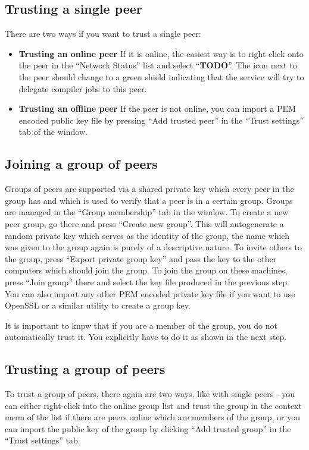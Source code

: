 \documentclass[a4paper,9pt]{scrartcl}
\begin{document}
\subsection{Trusting a single peer}
There are two ways if you want to trust a single peer:\\
\smallskip
\begin{itemize}
  \item{\bf Trusting an online peer} If it is online, the easiest way is to right click onto the peer in the ``Network Status'' list and select ``\textbf{TODO}''. The icon next to the peer should change to a green shield indicating that the service will try to delegate compiler jobs to this peer.
  \item{\bf Trusting an offline peer} If the peer is not online, you can import a PEM encoded public key file by pressing ``Add trusted peer'' in the ``Trust settings'' tab of the window.
\end{itemize}


\subsection{Joining a group of peers}

Groups of peers are supported via a shared private key which every peer in the group has and which is used to verify that a peer is in a certain group. Groups are managed in the ``Group membership'' tab in the window. To create a new peer group, go there and press ``Create new group''. This will autogenerate a random private key which serves as the identity of the group, the name which was given to the group again is purely of a descriptive nature. To invite others to the group, press ``Export private group key'' and pass the key to the other computers which should join the group. To join the group on these machines, press ``Join group'' there and select the key file produced in the previous step. You can also import any other PEM encoded private key file if you want to use OpenSSL or a similar utility to create a group key.

It is important to knpw that if you are a member of the group, you do not automatically trust it. You explicitly have to do it as shown in the next step.

\subsection{Trusting a group of peers}

To trust a group of peers, there again are two ways, like with single peers - you can either right-click into the online group list and trust the group in the context menu of the list if there are peers online which are members of the group, or you can import the public key of the group by clicking ``Add trusted group'' in the ``Trust settings'' tab.
\end{document}
